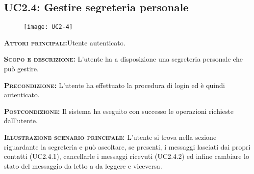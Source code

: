 \subsection{UC2.4: Gestire segreteria personale}
\begin{figure}[H]
\begin{center}
\texttt{[image: UC2-4]}
\caption{}\label{fig:}
\end{center}
\end{figure}
\begin{description}
\item{\scshape\bfseries Attori principali:}Utente autenticato.
\item{\scshape\bfseries Scopo e descrizione:} L'utente ha a disposizione una segreteria personale che può gestire.
\item{\scshape\bfseries Precondizione:} L'utente ha effettuato la procedura di login ed è quindi autenticato.
\item{\scshape\bfseries Postcondizione:} Il sistema ha eseguito con successo le operazioni richieste dall'utente.
\item{\scshape\bfseries Illustrazione scenario principale:} L'utente si trova nella sezione riguardante la segreteria e può ascoltare, se presenti, i messaggi lasciati dai propri contatti (UC2.4.1), cancellarle i messaggi ricevuti (UC2.4.2) ed infine cambiare lo stato del messaggio da letto a da leggere e viceversa.
\end{description}

